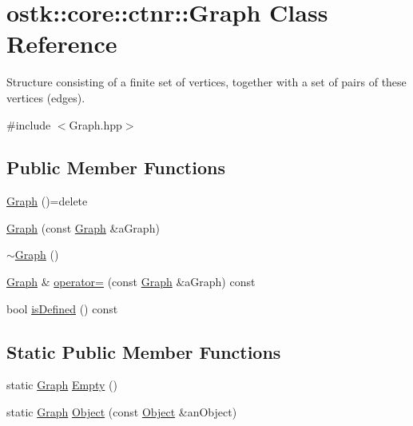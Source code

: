 \hypertarget{classostk_1_1core_1_1ctnr_1_1_graph}{}\section{ostk\+:\+:core\+:\+:ctnr\+:\+:Graph Class Reference}
\label{classostk_1_1core_1_1ctnr_1_1_graph}


Structure consisting of a finite set of vertices, together with a set of pairs of these vertices (edges).  




{\ttfamily \#include $<$Graph.\+hpp$>$}

\subsection*{Public Member Functions}
\begin{DoxyCompactItemize}
\item 
\hyperlink{classostk_1_1core_1_1ctnr_1_1_graph_aef0aa2732a88c78f82f96e1b0be011a5}{Graph} ()=delete
\item 
\hyperlink{classostk_1_1core_1_1ctnr_1_1_graph_aac2d025d9c98fa83463f1a919c4aba43}{Graph} (const \hyperlink{classostk_1_1core_1_1ctnr_1_1_graph}{Graph} \&a\+Graph)
\item 
\hyperlink{classostk_1_1core_1_1ctnr_1_1_graph_a6ec509e6c553de5274d98d4758145044}{$\sim$\+Graph} ()
\item 
\hyperlink{classostk_1_1core_1_1ctnr_1_1_graph}{Graph} \& \hyperlink{classostk_1_1core_1_1ctnr_1_1_graph_a86ab35adfdfea54ae330e8a15afbb18b}{operator=} (const \hyperlink{classostk_1_1core_1_1ctnr_1_1_graph}{Graph} \&a\+Graph) const
\item 
bool \hyperlink{classostk_1_1core_1_1ctnr_1_1_graph_ab04be03b52837bfe9deadd308271dd9a}{is\+Defined} () const
\end{DoxyCompactItemize}
\subsection*{Static Public Member Functions}
\begin{DoxyCompactItemize}
\item 
static \hyperlink{classostk_1_1core_1_1ctnr_1_1_graph}{Graph} \hyperlink{classostk_1_1core_1_1ctnr_1_1_graph_ab3aa9db7f8faf8227172fbb33d728cbc}{Empty} ()
\item 
static \hyperlink{classostk_1_1core_1_1ctnr_1_1_graph}{Graph} \hyperlink{classostk_1_1core_1_1ctnr_1_1_graph_add4642bceba0c00fbc9e71632bf32f6b}{Object} (const \hyperlink{classostk_1_1core_1_1ctnr_1_1_object}{Object} \&an\+Object)
\end{DoxyCompactItemize}
